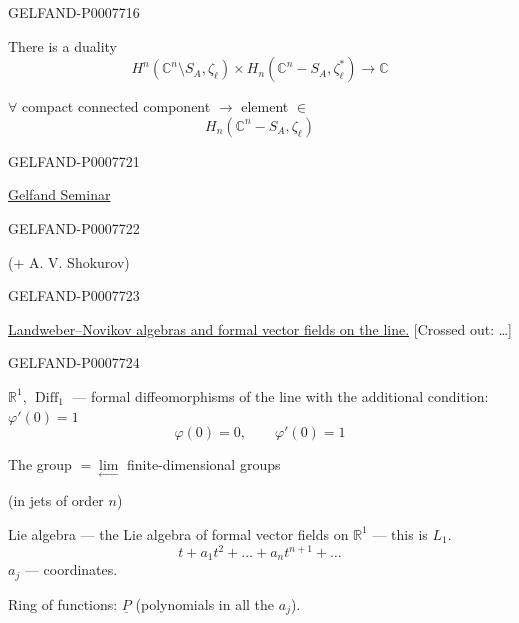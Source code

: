 \begin{GelfandAdjacentEvidence}{GELFAND-P000771}{6}


There is a duality
\[
H^n(\mathbb C^n\setminus S_A,\zeta_\ell)\times
H_n(\mathbb C^n-S_A,\zeta_\ell^*)\longrightarrow\mathbb C
\]

\(\forall\) compact connected component \(\longrightarrow\) element \(\in\)
\[
H_n(\mathbb C^n-S_A,\zeta_\ell)
\]
\end{GelfandAdjacentEvidence}



\begin{GelfandAdjacentEvidence}{GELFAND-P000772}{1}

\qquad\underline{Gelfand Seminar}

\end{GelfandAdjacentEvidence}
\begin{GelfandAdjacentEvidence}{GELFAND-P000772}{2}


(+ A. V. Shokurov)
\end{GelfandAdjacentEvidence}
\begin{GelfandAdjacentEvidence}{GELFAND-P000772}{3}


\underline{Landweber--Novikov algebras and formal vector fields on the line.}
[Crossed out: …]
\end{GelfandAdjacentEvidence}
\begin{GelfandAdjacentEvidence}{GELFAND-P000772}{4}


\(\mathbb R^1\), \(\operatorname{Diff}_1\) --- formal diffeomorphisms of the line with the additional condition: \(\varphi'(0)=1\)
\[
\varphi(0)=0,\qquad\varphi'(0)=1
\]

The group \(=\underset{\longleftarrow}{\lim}\) finite-dimensional groups

(in jets of order \(n\))

Lie algebra --- the Lie algebra of formal vector fields on \(\mathbb R^1\) --- this is \(L_1\).
\[
t+a_1t^2+\ldots+a_nt^{n+1}+\ldots
\]
\(a_j\) --- coordinates.

Ring of functions: \(\underline P\) (polynomials in all the \(a_j\)).
\end{GelfandAdjacentEvidence}
